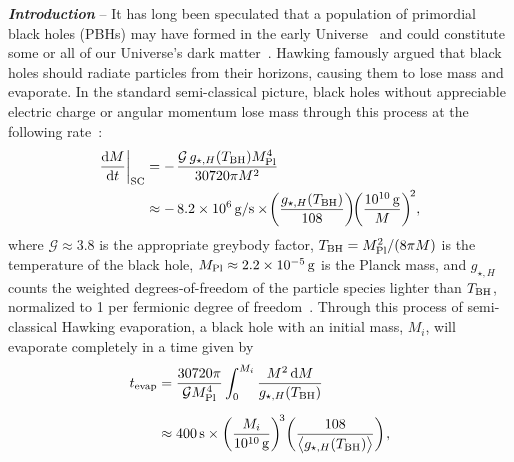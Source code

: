\documentclass[aps, prl, reprint, preprintnumbers, showpacs, floatfix, nofootinbib, superscriptaddress, %
nofootinbib]{revtex4-1}
\begin{document}
\maketitle


\textit{\textbf{Introduction}} -- It has long been speculated that a population of primordial black holes (PBHs) may have formed in the early Universe~\cite{Zeldovich:1967lct, Hawking:1971ei} and could constitute some or all of our Universe's dark matter~\cite{Chapline:1975ojl, Meszaros:1975ef}. Hawking famously argued that black holes should radiate particles from their horizons, causing them to lose mass and evaporate. In the standard semi-classical picture, black holes without appreciable electric charge or angular momentum lose mass through this process at the following rate~\cite{Hawking:1975vcx}:
%
\begin{align}
\label{eq:SC}
    \frac{{\rm d}M}{{\rm d}t}\bigg|_{\rm SC}
        &=
            -\mspace{2mu}\frac{\mathcal{G}\,g_{\star, H}(T_{\rm BH}) M_{\rm Pl}^{4}}{30720 \pi M^{2}}\\
        &\approx
            -\,8.2 \times 10^{6}\,{\rm g/s} \times\! \bigg(\frac{g_{\star, H}(T_{\rm BH})}{108}\bigg)\!\bigg(\frac{10^{10}\,{\rm g}}{M}\bigg)^{\!2}, \nonumber
\end{align}
%
where $\mathcal{G} \approx 3.8$ is the appropriate greybody factor, $T_{\rm BH} = M^{2}_{\rm Pl}/(8\pi M)$ is the temperature of the black hole, $M_{\rm Pl} \approx 2.2 \times 10^{-5}\,{\rm g}$ is the Planck mass, and $g_{\star, H}$ counts the weighted degrees-of-freedom of the particle species lighter than $T_{\rm BH}$, normalized to 1 per fermionic degree of freedom~\cite{MacGibbon:1990zk, MacGibbon:1991tj}. Through this process of semi-classical Hawking evaporation, a black hole with an initial mass, $M_{i}$, will evaporate completely in a time given by
%
\begin{align}
    t_{\rm evap}
        &=
            \frac{30720 \pi}{\mathcal{G} M^{4}_{\rm Pl}} \int_{0}^{M_{i}} \frac{M^{2}\, {\rm d}M}{g_{\star, H}(T_{\rm BH})}\\[2mm]
        &\approx
            400\,{\rm s} \times \bigg(\frac{M_{i}}{10^{10}\,{\rm g}}\bigg)^{\!3} \bigg(\frac{108}{\big\langle g_{\star, H}(T_{\rm BH})\big\rangle}\bigg)\mspace{1.5mu} , \nonumber 
\end{align}
%
\end{document}
